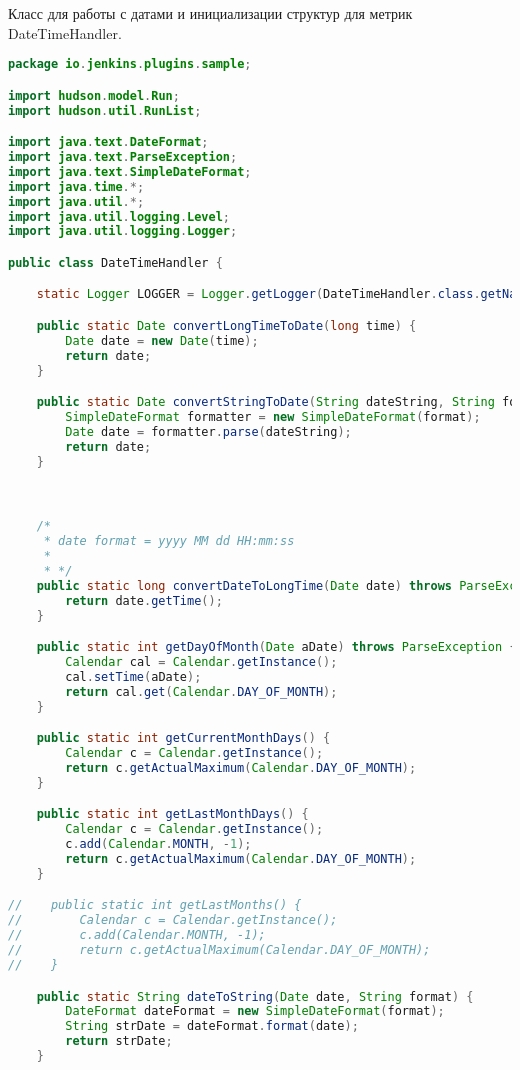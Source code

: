 Класс для работы с датами и инициализации структур для метрик DateTimeHandler.

\begin{lstlisting}[language=Java]
package io.jenkins.plugins.sample;

import hudson.model.Run;
import hudson.util.RunList;

import java.text.DateFormat;
import java.text.ParseException;
import java.text.SimpleDateFormat;
import java.time.*;
import java.util.*;
import java.util.logging.Level;
import java.util.logging.Logger;

public class DateTimeHandler {

    static Logger LOGGER = Logger.getLogger(DateTimeHandler.class.getName());

    public static Date convertLongTimeToDate(long time) {
        Date date = new Date(time);
        return date;
    }

    public static Date convertStringToDate(String dateString, String format) throws ParseException {
        SimpleDateFormat formatter = new SimpleDateFormat(format);
        Date date = formatter.parse(dateString);
        return date;
    }



    /*
     * date format = yyyy MM dd HH:mm:ss
     *
     * */
    public static long convertDateToLongTime(Date date) throws ParseException {
        return date.getTime();
    }

    public static int getDayOfMonth(Date aDate) throws ParseException {
        Calendar cal = Calendar.getInstance();
        cal.setTime(aDate);
        return cal.get(Calendar.DAY_OF_MONTH);
    }

    public static int getCurrentMonthDays() {
        Calendar c = Calendar.getInstance();
        return c.getActualMaximum(Calendar.DAY_OF_MONTH);
    }

    public static int getLastMonthDays() {
        Calendar c = Calendar.getInstance();
        c.add(Calendar.MONTH, -1);
        return c.getActualMaximum(Calendar.DAY_OF_MONTH);
    }

//    public static int getLastMonths() {
//        Calendar c = Calendar.getInstance();
//        c.add(Calendar.MONTH, -1);
//        return c.getActualMaximum(Calendar.DAY_OF_MONTH);
//    }

    public static String dateToString(Date date, String format) {
        DateFormat dateFormat = new SimpleDateFormat(format);
        String strDate = dateFormat.format(date);
        return strDate;
    }


\end{lstlisting}

